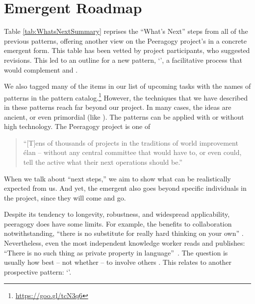 \section{Emergent Roadmap} \label{sec:Distributed_Roadmap}

Table \ref{tab:WhatsNextSummary} reprises the ``What's Next'' steps
from all of the previous patterns, offering another view on the
Peeragogy project's  in a concrete emergent form.
%
This table has been vetted by project participants, who suggested
revisions.  This led to an outline for a new pattern,
`', a facilitative process that would
complement  and .

We also tagged many of the items in our list of upcoming tasks with the names of
patterns in the pattern catalog.\footnote{\url{https://goo.gl/tcN3q6}}
However, the techniques that we have described in these patterns reach
far beyond our project.  In many cases, the ideas are ancient, or even
primordial (like ).  The patterns can be
applied with or without high technology.  The Peeragogy project is one
of
\begin{quote}
 ``[T]ens of thousands of projects in the traditions of world
improvement \'elan -- without any central committee that would have
to, or even could, tell the active what their next operations should
be.'' \cite[p. 402]{sloterdijk2013change}
\end{quote}
When we talk about ``next steps,'' we aim to show what can be
realistically expected from us.
And yet, the emergent  also goes beyond specific
individuals in the project, since they will come and go.

Despite its tendency to longevity, robustness, and
widespread applicability, peeragogy does have some limits. For example,
the benefits to collaboration
notwithstanding, 
``there is no substitute for really hard
thinking on your own'' \cite{atiyah1974research}.
Nevertheless, even the most independent knowledge worker reads and
publishes: ``There is no such thing as private property in
language''~\cite[p.~559]{jakobson1971selected}.  The question is
usually how best -- not whether -- to involve others
\cite{coase1937nature,coases-penguin}.  This relates to another
prospective pattern: `'.

